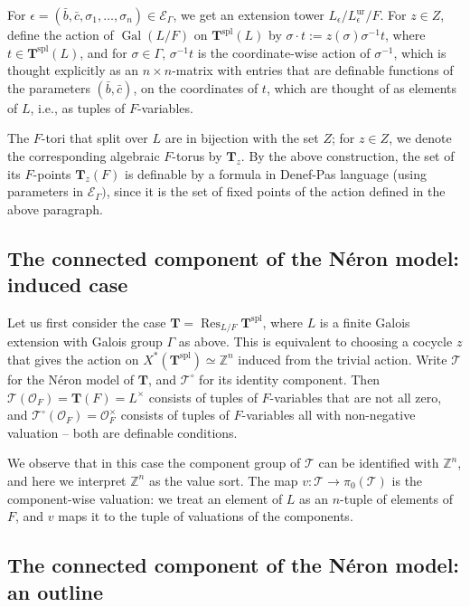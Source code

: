 \documentclass{amsart}
\newcommand{\Z}{{\mathbb Z}}
\newcommand{\ri}{\mathcal{O}}
\newcommand{\gal}{\operatorname{Gal}}
\newcommand{\ur}{\mathrm{ur}}
\newcommand{\bT}{\mathbf {T}}
\newcommand\cE{{\mathcal E}}
\newcommand\spl{\mathrm{spl}}
\newcommand{\Ner}[1]{\mathcal{#1}}
\newcommand{\NerC}[1]{\mathcal{#1}^\circ}
\DeclareMathOperator{\Res}{Res}
\theoremstyle{plain}
\theoremstyle{definition}
\begin{document}
For $\epsilon=(\bar b, \bar c, \sigma_1, \dots, \sigma_n)\in \cE_\Gamma$, we get an extension tower 
$L_\epsilon/L_\epsilon^\ur/F$. For $z\in Z$, define the action of $\gal(L/F)$ on $\bT^\spl(L)$ by
$\sigma\cdot  t:=z(\sigma)\sigma^{-1}t$, where $t\in \bT^\spl(L)$, and for $\sigma\in \Gamma$, 
$\sigma^{-1}t$ is the coordinate-wise action of $\sigma^{-1}$, which is thought explicitly as an $n\times n$-matrix with entries that are definable functions of the parameters $(\bar b, \bar c)$, on the coordinates of $t$, which are thought of as elements of $L$, i.e., as tuples of $F$-variables. 

The $F$-tori that split over $L$ are in bijection with  the set $Z$; 
for $z\in Z$, we denote the corresponding algebraic $F$-torus by $\bT_z$. 
By the above construction, the set of its $F$-points $\bT_z(F)$ is definable by a formula in Denef-Pas language (using parameters in $\cE_\Gamma)$, since it is the set of fixed points of the action defined in the above paragraph. 

\subsection{The connected component of the N\'eron model: induced case}
Let us first consider the case $\bT=\Res_{L/F} \bT^\spl$, where $L$ is a finite Galois extension with Galois group $\Gamma$ as above. This is equivalent to choosing a cocycle $z$ that gives the action on $X^\ast(\bT^\spl)\simeq \Z^n$ induced from the trivial action. 
Write $\Ner{T}$ for the N\'eron model of $\bT$, and $\NerC{T}$ for its identity component.  Then $\Ner{T}(\ri_F) = \bT(F) = L^\times$ consists of tuples of $F$-variables that are not all zero, and $\NerC{T}(\ri_F) = \ri_F^\times$ consists of tuples of $F$-variables all with non-negative valuation -- both are definable conditions.

We observe that in this case the component group of $\Ner{T}$ can be identified with $\Z^n$, and here we interpret $\Z^n$ as the value sort. The map $v:\Ner{T} \to \pi_0(\Ner{T})$ is the component-wise valuation: we treat an element of $L$ as an $n$-tuple of elements of $F$, and $v$ maps it to the  tuple of valuations of the components. 

\subsection{The connected component of the N\'eron model: an outline}
\end{document}
